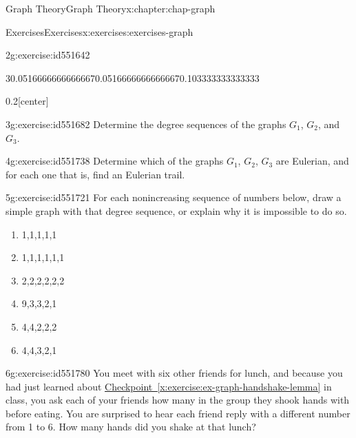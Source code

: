 \documentclass[oneside,10pt,]{book}
\newcommand{\xreffont}{\relax}
\numberwithin{equation}{section}
\begin{document}
\begin{chapterptx}{Graph Theory}{}{Graph Theory}{}{}{x:chapter:chap-graph}
\begin{exercises-section}{Exercises}{}{Exercises}{}{}{x:exercises:exercises-graph}
\begin{divisionexercise}{2}{}{}{g:exercise:id551642}
\begin{sidebyside}{3}{0.0516666666666667}{0.0516666666666667}{0.103333333333333}
\begin{sbspanel}{0.2}[center]
{
}%
\end{sbspanel}%
\end{sidebyside}%
\end{divisionexercise}%
\begin{divisionexercise}{3}{}{}{g:exercise:id551682}%
Determine the degree sequences of the graphs \(G_1\), \(G_2\), and \(G_3\).%
\end{divisionexercise}%
\begin{divisionexercise}{4}{}{}{g:exercise:id551738}%
Determine which of the graphs \(G_1\), \(G_2\), \(G_3\) are Eulerian, and for each one that is, find an Eulerian trail.%
\end{divisionexercise}%
\begin{divisionexercise}{5}{}{}{g:exercise:id551721}%
For each nonincreasing sequence of numbers below, draw a simple graph with that degree sequence, or explain why it is impossible to do so.%
\begin{enumerate}[label=(\alph*)]
\item{}1,1,1,1,1%
\item{}1,1,1,1,1,1%
\item{}2,2,2,2,2,2%
\item{}9,3,3,2,1%
\item{}4,4,2,2,2%
\item{}4,4,3,2,1%
\end{enumerate}
%
\end{divisionexercise}%
\begin{divisionexercise}{6}{}{}{g:exercise:id551780}%
You meet with six other friends for lunch, and because you had just learned about \hyperref[x:exercise:ex-graph-handshake-lemma]{Checkpoint~{\xreffont\ref{x:exercise:ex-graph-handshake-lemma}}} in class, you ask each of your friends how many in the group they shook hands with before eating. You are surprised to hear each friend reply with a different number from 1 to 6. How many hands did you shake at that lunch?%

\end{divisionexercise}
\end{exercises-section}
\end{chapterptx}
\end{document}
